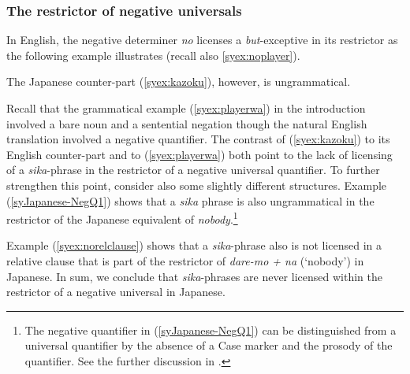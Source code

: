\documentclass[output=paper]{langscibook}
\begin{document}
\z

\subsubsection{The restrictor of negative universals}   
In English, the negative determiner \emph{no} licenses a \emph{but}-exceptive in its restrictor as the following example illustrates (recall also \ref{syex:noplayer}).

\z

The  Japanese counter-part (\ref{syex:kazoku}), however, is ungrammatical.

\z

Recall that the grammatical example (\ref{syex:playerwa}) in the introduction involved a bare noun and a sentential negation though the natural English translation involved a negative quantifier. The contrast of (\ref{syex:kazoku}) to its English counter-part and to (\ref{syex:playerwa}) both point to the lack of licensing of a \emph{sika}-phrase in the restrictor of a negative universal quantifier.  To further strengthen this point, consider also some slightly different structures.
Example (\ref{syJapanese-NegQ1}) shows that a \emph{sika} phrase is also ungrammatical in the restrictor of the Japanese equivalent of \emph{nobody}.\footnote{The negative quantifier in (\ref{syJapanese-NegQ1}) can be distinguished from a universal quantifier by the absence of a Case marker and the prosody of the quantifier. See the further discussion in .}

\z

Example (\ref{syex:norelclause}) shows that a \emph{sika}-phrase also is not licensed in a relative clause that is part of the restrictor of \emph{dare-mo + na} (`nobody') in Japanese.  In sum, we conclude that \emph{sika}-phrases are never licensed within the restrictor of a negative universal in Japanese.
\end{document}
